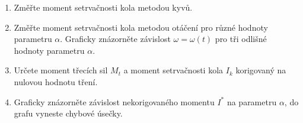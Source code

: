 \documentclass[protokol.tex]{subfiles}
\begin{document}
\begin{enumerate}
\item Změřte moment setrvačnosti kola metodou kyvů.
\item Změřte moment setrvačnosti kola metodou otáčení pro různé hodnoty parametru $\alpha$. Graficky znázorněte závislost $\omega = \omega(t)$ pro tři odlišné hodnoty parametru $\alpha$.
\item Určete moment třecích sil $M_t$ a moment setrvačnosti kola $I_k$ korigovaný na nulovou hodnotu tření. 
\item Graficky znázorněte závislost nekorigovaného momentu $I^*$ na parametru $\alpha$, do grafu vyneste chybové úsečky.
\end{enumerate}
\end{document}
